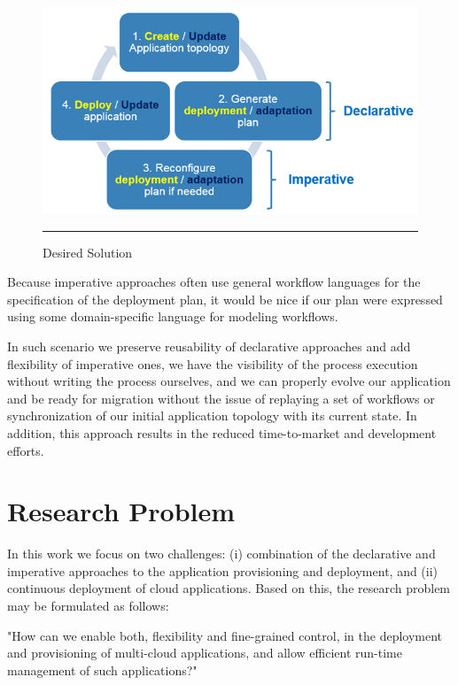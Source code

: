 \noindent

\begin{figure}[htbp]
	\centering
		\includegraphics[width=34em]{./Figures/Desired}
		\rule{38em}{0.5pt}
	\caption[Desired Solution]{Desired Solution}
	\label{fig:solution}
\end{figure}

\noindent

\noindent Because imperative approaches often use general workflow languages for the specification of the deployment plan, it would be nice if our plan were expressed using some domain-specific language for modeling workflows.

\noindent In such scenario we preserve reusability of declarative approaches and add flexibility of imperative ones, we have the visibility of the process execution without writing the process ourselves, and we can properly evolve our application and be ready for migration without the issue of replaying a set of workflows or synchronization of our initial application topology with its current state. In addition, this approach results in the reduced time-to-market and development efforts.


\section{Research Problem}

\noindent In this work we focus on two challenges: (i) combination of the declarative and imperative approaches to the application provisioning and deployment, and (ii) continuous deployment of cloud applications. Based on this, the research problem may be formulated as follows: 

\begin{center}
"How can we enable both, flexibility and fine-grained control, in the deployment and provisioning of multi-cloud applications, and allow efficient run-time management of such applications?"
\end{center}

